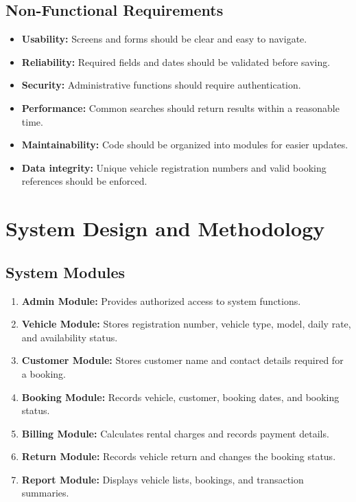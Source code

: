 \documentclass[11pt,a4paper]{report}
\begin{document}
\subsection{Non-Functional Requirements}
\begin{itemize}
\item \textbf{Usability:} Screens and forms should be clear and easy to navigate.
\item \textbf{Reliability:} Required fields and dates should be validated before saving.
\item \textbf{Security:} Administrative functions should require authentication.
\item \textbf{Performance:} Common searches should return results within a reasonable time.
\item \textbf{Maintainability:} Code should be organized into modules for easier updates.
\item \textbf{Data integrity:} Unique vehicle registration numbers and valid booking references should be enforced.
\end{itemize}

\section{System Design and Methodology}
\subsection{System Modules}
\begin{enumerate}
\item \textbf{Admin Module:} Provides authorized access to system functions.
\item \textbf{Vehicle Module:} Stores registration number, vehicle type, model, daily rate, and availability status.
\item \textbf{Customer Module:} Stores customer name and contact details required for a booking.
\item \textbf{Booking Module:} Records vehicle, customer, booking dates, and booking status.
\item \textbf{Billing Module:} Calculates rental charges and records payment details.
\item \textbf{Return Module:} Records vehicle return and changes the booking status.
\item \textbf{Report Module:} Displays vehicle lists, bookings, and transaction summaries.
\end{enumerate}
\end{document}
